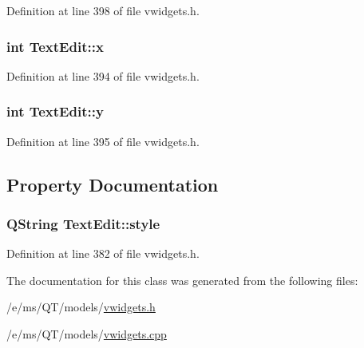 Definition at line 398 of file vwidgets.h.

\hypertarget{classTextEdit_adab33b65d433239f87a12560bc2f2a21}{
\subsubsection[{x}]{\setlength{\rightskip}{0pt plus 5cm}int {\bf TextEdit::x}}}
\label{classTextEdit_adab33b65d433239f87a12560bc2f2a21}


Definition at line 394 of file vwidgets.h.

\hypertarget{classTextEdit_a90c945cd2f04eeb3d7f634ff9053fc23}{
\subsubsection[{y}]{\setlength{\rightskip}{0pt plus 5cm}int {\bf TextEdit::y}}}
\label{classTextEdit_a90c945cd2f04eeb3d7f634ff9053fc23}


Definition at line 395 of file vwidgets.h.



\subsection{Property Documentation}
\hypertarget{classTextEdit_a7ae2596c8446c03263b01ea2112b0638}{
\subsubsection[{style}]{\setlength{\rightskip}{0pt plus 5cm}QString TextEdit::style}}
\label{classTextEdit_a7ae2596c8446c03263b01ea2112b0638}


Definition at line 382 of file vwidgets.h.



The documentation for this class was generated from the following files:\begin{DoxyCompactItemize}
\item 
/e/ms/QT/models/\hyperlink{vwidgets_8h}{vwidgets.h}\item 
/e/ms/QT/models/\hyperlink{vwidgets_8cpp}{vwidgets.cpp}\end{DoxyCompactItemize}
